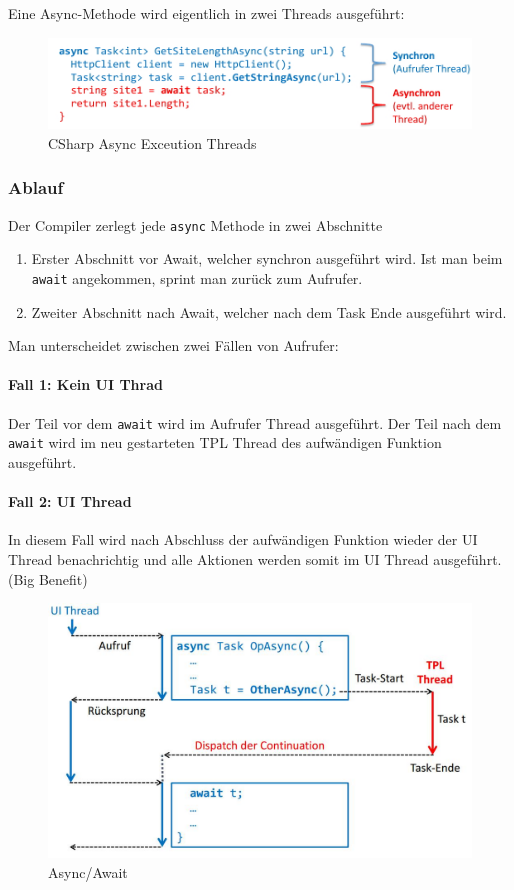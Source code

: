 Eine Async-Methode wird eigentlich in zwei Threads ausgeführt:
\begin{figure}[h]
	\centering
	\includegraphics[width=0.7\linewidth]{img/csharp_async_threads}
	\caption{CSharp Async Exceution Threads}
	\label{fig:csharpasyncthreads}
\end{figure}

\subsubsection{Ablauf}
Der Compiler zerlegt jede \lstinline|async| Methode in zwei Abschnitte
\begin{enumerate}
	\item Erster Abschnitt vor Await, welcher synchron ausgeführt wird. Ist man beim \lstinline|await| angekommen, sprint man zurück zum Aufrufer.
	\item Zweiter Abschnitt nach Await, welcher nach dem Task Ende ausgeführt wird.
\end{enumerate}

Man unterscheidet zwischen zwei Fällen von Aufrufer:

\paragraph{Fall 1: Kein UI Thrad}
Der Teil vor dem \lstinline|await| wird im Aufrufer Thread ausgeführt. Der Teil nach dem \lstinline|await| wird im neu gestarteten TPL Thread des aufwändigen Funktion ausgeführt.

\paragraph{Fall 2: UI Thread}
In diesem Fall wird nach Abschluss der aufwändigen Funktion wieder der UI Thread benachrichtig und alle Aktionen werden somit im UI Thread ausgeführt. (Big Benefit)
\begin{figure}[h!]
	\centering
	\includegraphics[width=0.7\linewidth]{img/async_await}
	\caption{Async/Await}
	\label{fig:asyncawait}
\end{figure}

